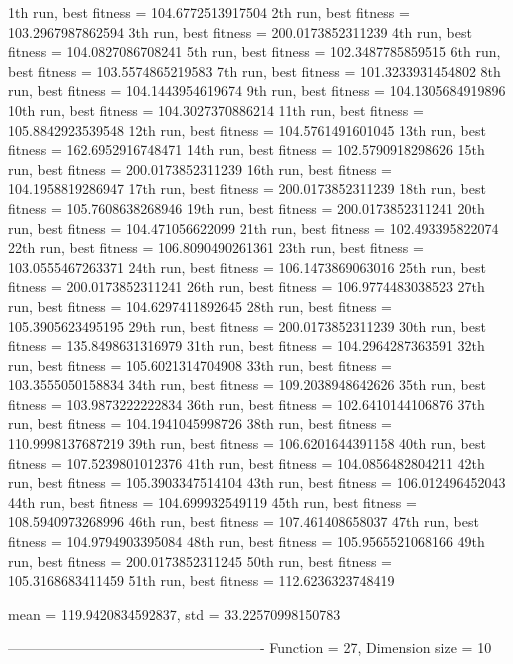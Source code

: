 1th run, best fitness = 104.6772513917504
2th run, best fitness = 103.2967987862594
3th run, best fitness = 200.0173852311239
4th run, best fitness = 104.0827086708241
5th run, best fitness = 102.3487785859515
6th run, best fitness = 103.5574865219583
7th run, best fitness = 101.3233931454802
8th run, best fitness = 104.1443954619674
9th run, best fitness = 104.1305684919896
10th run, best fitness = 104.3027370886214
11th run, best fitness = 105.8842923539548
12th run, best fitness = 104.5761491601045
13th run, best fitness = 162.6952916748471
14th run, best fitness = 102.5790918298626
15th run, best fitness = 200.0173852311239
16th run, best fitness = 104.1958819286947
17th run, best fitness = 200.0173852311239
18th run, best fitness = 105.7608638268946
19th run, best fitness = 200.0173852311241
20th run, best fitness = 104.471056622099
21th run, best fitness = 102.493395822074
22th run, best fitness = 106.8090490261361
23th run, best fitness = 103.0555467263371
24th run, best fitness = 106.1473869063016
25th run, best fitness = 200.0173852311241
26th run, best fitness = 106.9774483038523
27th run, best fitness = 104.6297411892645
28th run, best fitness = 105.3905623495195
29th run, best fitness = 200.0173852311239
30th run, best fitness = 135.8498631316979
31th run, best fitness = 104.2964287363591
32th run, best fitness = 105.6021314704908
33th run, best fitness = 103.3555050158834
34th run, best fitness = 109.2038948642626
35th run, best fitness = 103.9873222222834
36th run, best fitness = 102.6410144106876
37th run, best fitness = 104.1941045998726
38th run, best fitness = 110.9998137687219
39th run, best fitness = 106.6201644391158
40th run, best fitness = 107.5239801012376
41th run, best fitness = 104.0856482804211
42th run, best fitness = 105.3903347514104
43th run, best fitness = 106.012496452043
44th run, best fitness = 104.699932549119
45th run, best fitness = 108.5940973268996
46th run, best fitness = 107.461408658037
47th run, best fitness = 104.9794903395084
48th run, best fitness = 105.9565521068166
49th run, best fitness = 200.0173852311245
50th run, best fitness = 105.3168683411459
51th run, best fitness = 112.6236323748419

mean = 119.9420834592837, std = 33.22570998150783

-------------------------------------------------------
Function = 27, Dimension size = 10

